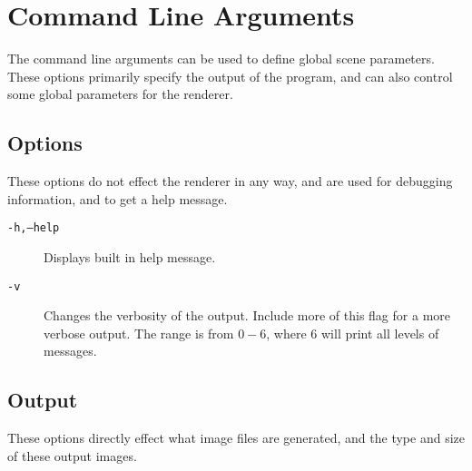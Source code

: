 \documentclass[../pbr.tex]{subfile}
\begin{document}
\section{Command Line Arguments}%
\label{sec:command_line_arguments}

The command line arguments can be used to define global scene parameters. These
options primarily specify the output of the program, and can also control some
global parameters for the renderer.

\subsection{Options}%
\label{sub:options}

These options do not effect the renderer in any way, and are used for debugging
information, and to get a help message.

\begin{description}
  \item[\texttt{-h,--help}] Displays built in help message.
  \item[\texttt{-v}] Changes the verbosity of the output. Include more of this
    flag for a more verbose output. The range is from $0-6$, where $6$ will
    print all levels of messages.
\end{description}

\subsection{Output}%
\label{sub:output}

These options directly effect what image files are generated, and the type and
size of these output images.
\end{document}
